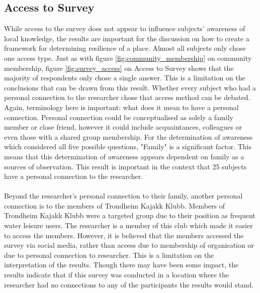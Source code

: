 \paragraph{}

\subsection{Access to Survey} \label{discuss-access-survey}
While access to the survey does not appear to influence subjects' awareness of local knowledge, the results are important for the discussion on how to create a framework for determining resilience of a place. Almost all subjects only chose one access type. Just as with figure \ref{fig:community_membership} on community membership, figure \ref{fig:survey_access} on Access to Survey shows that the majority of respondents only chose a single answer. This is a limitation on the conclusions that can be drawn from this result. Whether every subject who had a personal connection to the researcher chose that access method can be debated. Again, terminology here is important: what does it mean to have a personal connection. Personal connection could be conceptualised as solely a family member or close friend, however it could include acquaintances, colleagues or even those with a shared group membership. For the determination of awareness which considered all five possible questions, "Family" is a significant factor. This means that this determination of awareness appears dependent on family as a sources of observation. This result is important in the context that 25 subjects have a personal connection to the researcher.
\paragraph{}
Beyond the researcher's personal connection to their family, another personal connection is to the members of Trondheim Kajakk Klubb. Members of Trondheim Kajakk Klubb were a targeted group due to their position as frequent water leisure users. The researcher is a member of this club which made it easier to access the members. However, it is believed that the members accessed the survey via social media, rather than access due to  membership of organisation or due to personal connection to researcher. This is a limitation on the interpretation of the results. Though there may have been some impact, the results indicate that if this survey was conducted in a location where the researcher had no connections to any of the participants the results would stand.
